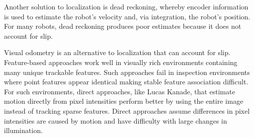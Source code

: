 \documentclass[letterpaper, 10 pt, conference]{ieeeconf}
\newcommand{\comment}[1]{} %
\begin{document}
Another solution to localization is dead reckoning, whereby encoder information is used to estimate the robot's velocity and, via integration, the robot's position. For many robots, dead reckoning produces poor estimates because it does not account for slip.

\comment{Might want to motivate what feature based and direct approaches are. Cite people? Also you probably want to be citing someone for saying that feature association fails. Talk to Dey about whom to cit otherwise include a figure.}

Visual odometry is an alternative to localization that can account for slip. Feature-based approaches work well in visually rich environments containing many unique trackable features. Such approaches fail in inspection environments where point features appear identical making stable feature association difficult. For such environments, direct approaches, like Lucas Kanade, that estimate motion directly from pixel intensities perform better by using the entire image instead of tracking sparse features. Direct approaches assume differences in pixel intensities are caused by motion and have difficulty with large changes in illumination.
\end{document}
